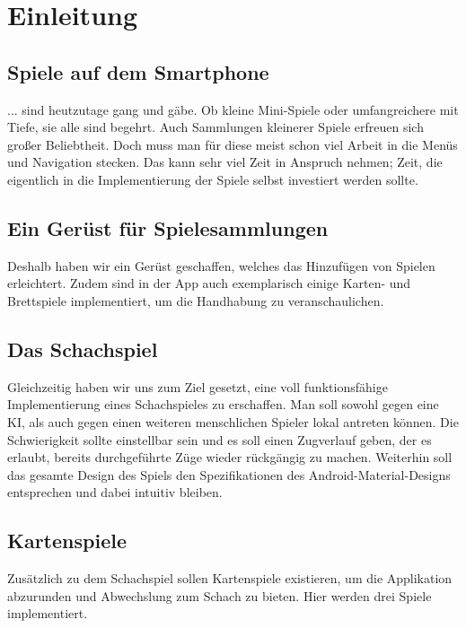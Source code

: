 \chapter{Einleitung}

\section{Spiele auf dem Smartphone}
\sectionauthor{\leonard}

... sind heutzutage gang und gäbe. Ob kleine Mini-Spiele oder umfangreichere mit
Tiefe, sie alle sind begehrt. Auch Sammlungen kleinerer Spiele erfreuen sich
großer Beliebtheit. Doch muss man für diese meist schon viel Arbeit in die
Menüs und Navigation stecken. Das kann sehr viel Zeit in Anspruch nehmen; Zeit,
die eigentlich in die Implementierung der Spiele selbst investiert werden
sollte.

\section{Ein Gerüst für Spielesammlungen}
\sectionauthor{\leonard}

Deshalb haben wir ein Gerüst geschaffen, welches das Hinzufügen von Spielen
erleichtert. Zudem sind in der App auch exemplarisch einige Karten- und
Brettspiele implementiert, um die Handhabung zu veranschaulichen.

\section{Das Schachspiel}
\sectionauthor{\frank}

Gleichzeitig haben wir uns zum Ziel gesetzt, eine voll funktionsfähige
Implementierung eines Schachspieles zu erschaffen. Man soll sowohl gegen eine
KI, als auch gegen einen weiteren menschlichen Spieler lokal antreten können.
Die Schwierigkeit sollte einstellbar sein und es soll einen Zugverlauf geben,
der es erlaubt, bereits durchgeführte Züge wieder rückgängig zu machen.
Weiterhin soll das gesamte Design des Spiels den Spezifikationen des
Android-Material-Designs entsprechen und dabei intuitiv bleiben.

\section{Kartenspiele}
\sectionauthor{\frank}

Zusätzlich zu dem Schachspiel sollen Kartenspiele existieren, um die Applikation
abzurunden und Abwechslung zum Schach zu bieten. Hier werden drei Spiele
implementiert.
